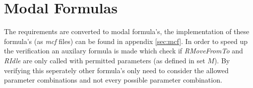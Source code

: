 \section{Modal Formulas}\label{sec:modal_formulas}
The requirements are converted to modal formula's, the implementation of these formula's (as \textit{mcf} files) can be found in appendix \ref{sec:mcf}. In order to speed up the verification an auxilary formula is made which check if \textit{RMoveFromTo} and \textit{RIdle} are only called with permitted parameters (as defined in set $M$). By verifying this seperately other formula's only need to consider the allowed parameter combinations and not every possible parameter combination.